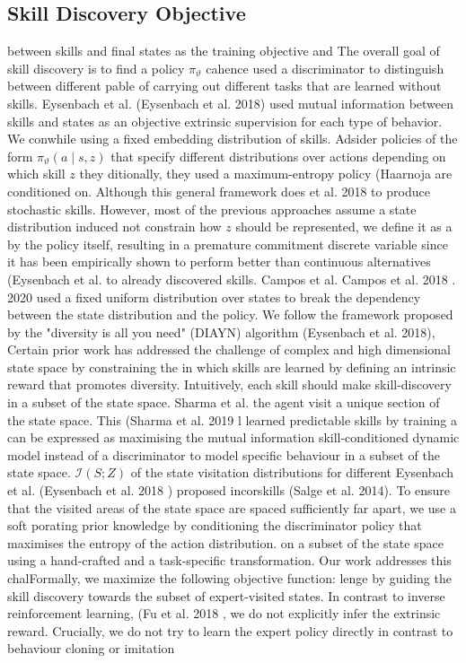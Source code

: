 \subsection{Skill Discovery Objective} between skills and final states as the training objective and The overall goal of skill discovery is to find a policy $\pi_{\vartheta}$ cahence used a discriminator to distinguish between different pable of carrying out different tasks that are learned without skills. Eysenbach et al. (Eysenbach et al. 2018) used mutual information between skills and states as an objective extrinsic supervision for each type of behavior. We conwhile using a fixed embedding distribution of skills. Adsider policies of the form $\pi_{\vartheta}(a \mid s, z)$ that specify different distributions over actions depending on which skill $z$ they ditionally, they used a maximum-entropy policy (Haarnoja are conditioned on. Although this general framework does et al. 2018 to produce stochastic skills. However, most of the previous approaches assume a state distribution induced not constrain how $z$ should be represented, we define it as a by the policy itself, resulting in a premature commitment discrete variable since it has been empirically shown to perform better than continuous alternatives (Eysenbach et al. to already discovered skills. Campos et al. Campos et al. 2018 . 2020 used a fixed uniform distribution over states to break the dependency between the state distribution and the policy. We follow the framework proposed by the "diversity is all you need" (DIAYN) algorithm (Eysenbach et al. 2018), Certain prior work has addressed the challenge of complex and high dimensional state space by constraining the in which skills are learned by defining an intrinsic reward that promotes diversity. Intuitively, each skill should make skill-discovery in a subset of the state space. Sharma et al. the agent visit a unique section of the state space. This (Sharma et al. 2019 l learned predictable skills by training a can be expressed as maximising the mutual information skill-conditioned dynamic model instead of a discriminator to model specific behaviour in a subset of the state space. $\mathcal{I}(S ; Z)$ of the state visitation distributions for different Eysenbach et al. (Eysenbach et al. 2018 ) proposed incorskills (Salge et al. 2014). To ensure that the visited areas of the state space are spaced sufficiently far apart, we use a soft porating prior knowledge by conditioning the discriminator policy that maximises the entropy of the action distribution. on a subset of the state space using a hand-crafted and a task-specific transformation. Our work addresses this chalFormally, we maximize the following objective function: lenge by guiding the skill discovery towards the subset of expert-visited states. In contrast to inverse reinforcement learning, (Fu et al. 2018 , we do not explicitly infer the extrinsic reward. Crucially, we do not try to learn the expert policy directly in contrast to behaviour cloning or imitation

